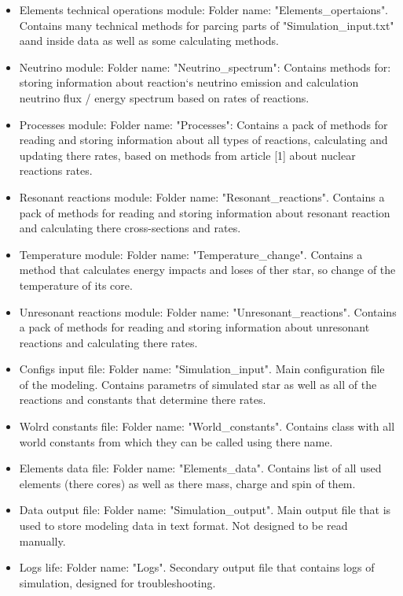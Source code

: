 \documentclass[a4paper,12pt]{article}
\begin{document}
\begin{itemize}
\item Elements technical operations module: Folder name: "Elements\_opertaions". Contains many technical methods for parcing parts of "Simulation\_input.txt" aand inside data as well as some calculating methods.

\item Neutrino module: Folder name: "Neutrino\_spectrum": Contains methods for: storing information about reaction`s neutrino emission and calculation neutrino flux / energy spectrum based on rates of reactions.

\item Processes module: Folder name: "Processes": Contains  a pack of methods for reading and storing information about all types of reactions, calculating and updating there rates, based on methods from article [1] about nuclear reactions rates.

\item Resonant reactions module: Folder name: "Resonant\_reactions". Contains a pack of methods for reading and storing information about resonant reaction and calculating there cross-sections and rates.

\item Temperature module: Folder name: "Temperature\_change". Contains a method that calculates energy impacts and loses of ther star, so change of the temperature of its core.

\item Unresonant reactions module: Folder name: "Unresonant\_reactions". Contains a pack of methods for reading and storing information about unresonant reactions and calculating there rates.

\item Configs input file: Folder name: "Simulation\_input". Main configuration file of the modeling. Contains parametrs of simulated star as well as all of the reactions and constants that determine there rates.

\item Wolrd constants file: Folder name: "World\_constants". Contains class with all world constants from which they can be called using there name.

\item Elements data file: Folder name: "Elements\_data". Contains list of all used elements (there cores) as well as there mass, charge and spin of them.

\item Data output file: Folder name: "Simulation\_output". Main output file that is used to store modeling data in text format. Not designed to be read manually.

\item Logs life: Folder name: "Logs". Secondary output file that contains logs of simulation, designed for troubleshooting.

\end{itemize}
\end{document}
